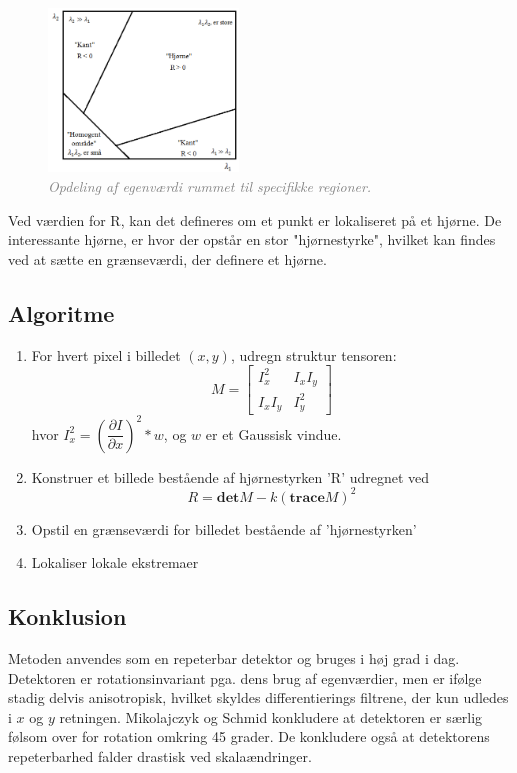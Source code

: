 \begin{enumerate}
{\begin{figure}[H]
    \centering
    \includegraphics[width=0.45\textwidth]{fig/26.png}
     \vspace{-1em}
    \begin{center}    
       \caption{\textcolor{gray}{\footnotesize \textit{ Opdeling af egenværdi rummet til specifikke regioner. }}}
    \label{fig:egen}
     \end{center}
     \vspace{-2.5em}
  \end{figure} \noindent
Ved værdien for R, kan det defineres om et punkt er lokaliseret på et hjørne. De interessante hjørne, er hvor der opstår en stor "hjørnestyrke", hvilket kan findes ved at sætte en grænseværdi, der definere et hjørne.
 }
\end{enumerate}
\subsection*{Algoritme}
\begin{enumerate}
\item{ For hvert pixel i billedet $(x,y)$, udregn struktur tensoren: $$ M = \begin{bmatrix}
I_x^2 & I_xI_y \\
I_xI_y & I_y^2
\end{bmatrix} $$hvor $ I_x^2 = (\dfrac{\partial I}{\partial x})^2 \ast w$, og $w$ er et Gaussisk vindue.}
\item{ Konstruer et billede bestående af hjørnestyrken 'R' udregnet ved $$ R = \textbf{det}M-k(\textbf{trace}M)^2 $$  }
\item{ Opstil en grænseværdi for billedet bestående af 'hjørnestyrken'}
\item{ Lokaliser lokale ekstremaer }
\end{enumerate}
\subsection*{Konklusion}
Metoden anvendes som en repeterbar detektor og bruges i høj grad i dag. Detektoren er rotationsinvariant pga. dens brug af egenværdier, men er ifølge \cite{eval} stadig delvis anisotropisk, hvilket skyldes differentierings filtrene, der kun udledes i $x$ og $y$ retningen. Mikolajczyk og Schmid \cite{eval} konkludere at detektoren er særlig følsom over for rotation omkring 45 grader. De konkludere også at detektorens repeterbarhed falder drastisk ved skalaændringer.